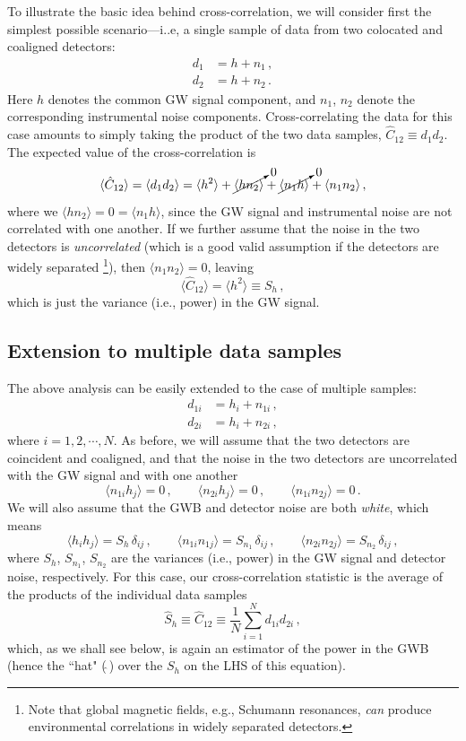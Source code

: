 \documentclass[11pt]{article}
\numberwithin{equation}{section}
\def\be{\begin{equation}}
\def\ee{\end{equation}}
\begin{document}
To illustrate the basic idea behind cross-correlation,
we will consider first the simplest possible scenario---i..e,
a single sample of data from two colocated and coaligned
detectors:
%
\be
\begin{aligned}
d_1 &= h + n_1\,,
\\
d_2 &= h + n_2\,.
\end{aligned}
\ee
%
Here $h$ denotes the common GW signal component, 
and $n_1$, $n_2$ denote the corresponding instrumental
noise components.
Cross-correlating the data for this case amounts to 
simply taking the product of the two data 
samples, $\hat C_{12}\equiv d_1 d_2$.
The expected value of the cross-correlation is
%
\be
\langle \hat C_{12}\rangle
=\langle d_1 d_2\rangle
= \langle h^2\rangle + \cancelto{0}{\langle h n_2\rangle} 
+ \cancelto{0}{\langle n_1 h\rangle}
+ \langle n_1 n_2\rangle\,,
\ee
%
where we $\langle h n_2\rangle = 0 = \langle n_1 h\rangle$,
since the GW signal and instrumental noise are not correlated
with one another.
If we further assume that the noise in the two detectors
is {\em uncorrelated} (which is a good valid assumption 
if the detectors are widely separated%
\footnote{Note that global magnetic fields, e.g., Schumann 
resonances, {\em can} produce environmental correlations in 
widely separated detectors.}), then $\langle n_1 n_2\rangle =0$,
leaving
%
\be
\langle \hat C_{12}\rangle = \langle h^2\rangle\equiv S_h\,,
\ee
which is just the variance (i.e., power) in the GW signal.

\subsection{Extension to multiple data samples}
\label{s:multiple_samples}

The above analysis can be easily extended to the case of 
multiple samples:
%
\be
\begin{aligned}
d_{1i} &= h_i + n_{1i}\,,
\\
d_{2i} &= h_i + n_{2i}\,,
\end{aligned}
\ee
%
where $i=1,2,\cdots,N$.
As before, we will assume that the two detectors are
coincident and coaligned, and that the noise in the
two detectors are uncorrelated with the GW signal 
and with one another
%
\be
\langle n_{1i} h_j\rangle = 0\,,
\qquad
\langle n_{2i} h_j\rangle = 0\,,
\qquad
\langle n_{1i}n_{2j}\rangle=0\,.
\ee
%
We will also assume that the GWB 
and detector noise are both {\em white}, which means 
%
\be
\langle h_ih_j\rangle = S_h\,\delta_{ij}\,,
\qquad
\langle n_{1i}n_{1j}\rangle = S_{n_1}\,\delta_{ij}\,,
\qquad
\langle n_{2i}n_{2j}\rangle = S_{n_2}\,\delta_{ij}\,,
\ee
%
where $S_h$, $S_{n_1}$, $S_{n_2}$ are the variances
(i.e., power) in the GW signal and detector noise, respectively.
For this case, our cross-correlation statistic is the
average of the products of the individual data samples
%
\be
\hat S_h 
\equiv \hat C_{12} 
\equiv \frac{1}{N}\sum_{i=1}^N d_{1i} d_{2i}\,,
\ee
%
which, as we shall see below, is again an estimator of the 
power in the GWB (hence the ``hat" ($\hat{\ }$) over the 
$S_h$ on the LHS of this equation).
\end{document}
